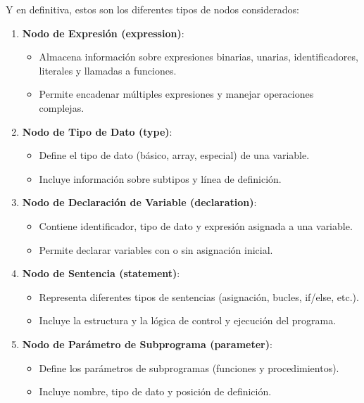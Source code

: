 \noindent
Y en definitiva, estos son los diferentes tipos de nodos considerados:

\begin{enumerate}
    \item \textbf{Nodo de Expresión (expression)}: 
    \begin{itemize}
        \item Almacena información sobre expresiones binarias, unarias, identificadores, literales y llamadas a funciones.
        \item Permite encadenar múltiples expresiones y manejar operaciones complejas.
    \end{itemize}

    \item \textbf{Nodo de Tipo de Dato (type)}:
    \begin{itemize}
        \item Define el tipo de dato (básico, array, especial) de una variable.
        \item Incluye información sobre subtipos y línea de definición.
    \end{itemize}

    \item \textbf{Nodo de Declaración de Variable (declaration)}:
    \begin{itemize}
        \item Contiene identificador, tipo de dato y expresión asignada a una variable.
        \item Permite declarar variables con o sin asignación inicial.
    \end{itemize}

    \item \textbf{Nodo de Sentencia (statement)}:
    \begin{itemize}
        \item Representa diferentes tipos de sentencias (asignación, bucles, if/else, etc.).
        \item Incluye la estructura y la lógica de control y ejecución del programa.
    \end{itemize}

    \item \textbf{Nodo de Parámetro de Subprograma (parameter)}:
    \begin{itemize}
        \item Define los parámetros de subprogramas (funciones y procedimientos).
        \item Incluye nombre, tipo de dato y posición de definición.
    \end{itemize}


\end{enumerate}

